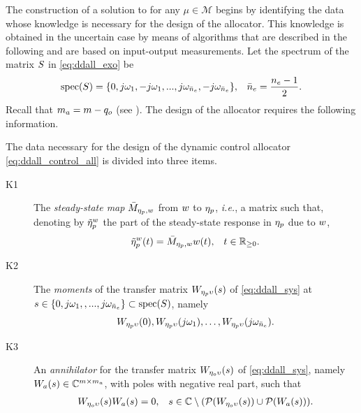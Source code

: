 The construction of a solution to  for any $\mu\in\mathcal{M}$ begins by identifying the data whose knowledge is necessary for the design of the allocator. This knowledge is obtained in the uncertain case by means of algorithms that are described in the following and are based on input-output measurements. Let the spectrum of the matrix $S$ in \eqref{eq:ddall_exo} be
\begin{align}
  \label{eq:ddall_exo_spec}
  \operatorname{spec}(S) &= \{0, j \omega_1, -j \omega_1, ..., j \omega_{\bar{n}_e}, - j \omega_{\bar{n}_e} \}, & \bar{n}_e = \frac{{n_e}-1}{2}.
\end{align}
Recall that $m_a=m-{q_o}$ (see ). The design of the allocator requires the following information.
\begin{definition}
  \label{def:ddall_data}
  The data necessary for the design of the dynamic control allocator \eqref{eq:ddall_control_all} is divided into three items.
  \begin{description}
    \item[K1] The \emph{steady-state map} $\bar{M}_{\eta_p, w}$ from $w$ to $\eta_p$, \emph{i.e.}, a matrix such that, denoting by $\tilde{\eta}_p^w$ the part of the steady-state response in $\eta_p$ due to $w$,
      \begin{align}
        \label{eq:ddall_K1mem}
        \tilde{\eta}_p^w(t) &= \bar{M}_{\eta_p, w}w(t), & t\in\mathbb{R}_{\geq 0}.
      \end{align}
    \item[K2] The \emph{moments} of the transfer matrix $W_{\eta_p\upsilon}(s)$ of \eqref{eq:ddall_sys} at $s\in\{0, j \omega_1,, ..., j \omega_{\bar{n}_e}\}\subset\operatorname{spec}(S)$, namely
      \begin{equation}
        \label{eq:ddall_K2mom}
        W_{\eta_p\upsilon}(0), W_{\eta_p\upsilon}(j \omega_1), \ldots, W_{\eta_p\upsilon}(j \omega_{\bar{n}_e}).
      \end{equation}
    \item[K3] An \emph{annihilator} for the transfer matrix $W_{\eta_o\upsilon}(s)$ of \eqref{eq:ddall_sys}, namely $W_a(s)\in\mathbb{C}^{m\times m_a}$, with poles with negative real part, such that
      \begin{align}
        \label{eq:ddall_W_a}
        W_{\eta_o\upsilon}(s)W_a(s) &= 0, & s\in\mathbb{C}\setminus(\operatorname{\mathcal{P}}(W_{\eta_o\upsilon}(s))\cup\operatorname{\mathcal{P}}(W_a(s))).
      \end{align}
  \end{description}\closestatement
\end{definition}

